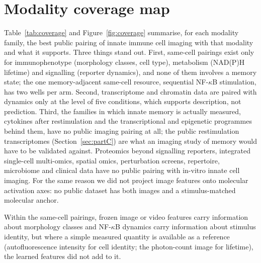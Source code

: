 \section{Modality coverage map}
\label{sec:coverage}
Table~\ref{tab:coverage} and Figure~\ref{fig:coverage} summarise, for each modality family,
the best public pairing of innate immune cell imaging with that modality and what it
supports. Three things stand out. First, same-cell pairings exist only for
immunophenotype (morphology classes, cell type), metabolism (NAD(P)H lifetime) and
signalling (reporter dynamics), and none of them involves a memory state; the one
memory-adjacent same-cell resource, sequential NF-\(\kappa\)B stimulation, has two wells per
arm. Second, transcriptome and chromatin data are paired with dynamics only at the level of
five conditions, which supports description, not prediction. Third, the families in which
innate memory is actually measured, cytokines after restimulation and the transcriptional
and epigenetic programmes behind them, have no public imaging pairing at all; the
public restimulation transcriptomes (Section~\ref{sec:partC}) are what an imaging study of
memory would have to be validated against. Proteomics beyond signalling reporters,
integrated single-cell multi-omics, spatial omics, perturbation screens, repertoire,
microbiome and clinical data have no public pairing with in-vitro innate cell imaging.
For the same reason we did not project image features onto molecular activation axes: no
public dataset has both images and a stimulus-matched molecular anchor.

Within the same-cell pairings, frozen image or video features carry information about
morphology classes and NF-\(\kappa\)B dynamics carry information about stimulus identity, but
where a simple measured quantity is available as a reference (autofluorescence intensity
for cell identity; the photon-count image for lifetime), the learned features did not add
to it.
